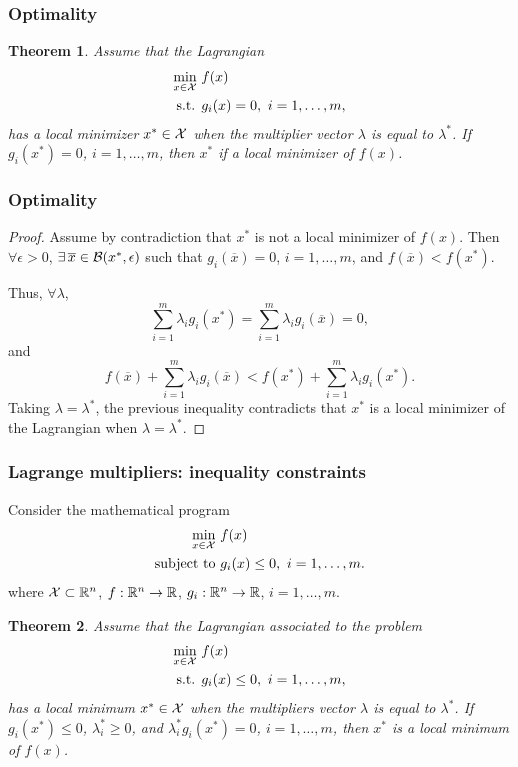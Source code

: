 \documentclass[usepdftitle=false]{beamer}
\newtheorem{thm}{Theorem}
\begin{document}
\begin{frame}
\frametitle{Optimality}

\begin{thm}
Assume that the Lagrangian
\begin{align*}
\min_{x \in {\mathcal{X}}} \ & f(x) \\
\mbox{s.t. } & g_i(x) = 0,\ i = 1,\ldots,m,
\end{align*}
has a local minimizer $x^* \in {\mathcal{X}}$ when the multiplier vector $\lambda$ is equal to $\lambda^*$.
If $g_i(x^*) = 0$, $i = 1,\ldots,m$, then $x^*$ if a local minimizer of $f(x)$.
\end{thm}

\end{frame}

\begin{frame}
\frametitle{Optimality}

\begin{proof}
Assume by contradiction that $x^*$ is not a local minimizer of $f(x)$.
Then $\forall \epsilon > 0$, $\exists\, \overline{x} \in {\mathcal{B}}(x^*, \epsilon)$ such that $g_i(\overline{x}) = 0$, $i = 1,\ldots,m$, and $f(\overline{x}) < f(x^*)$.
	
Thus, $\forall \lambda$,
	$$
	\sum_{i = 1}^{m} \lambda_i g_i(x^*) = \sum_{i = 1}^{m} \lambda_i g_i(\overline{x}) = 0,
	$$
and
$$
f(\overline{x}) + \sum_{i = 1}^{m} \lambda_i g_i(\overline{x}) < f(x^*) + \sum_{i = 1}^{m} \lambda_i g_i(x^*).
$$
Taking $\lambda = \lambda^*$, the previous inequality contradicts that $x^*$ is a local minimizer of the Lagrangian when $\lambda = \lambda^*$.
\end{proof}

\end{frame}

\begin{frame}
\frametitle{Lagrange multipliers: inequality constraints}

Consider the mathematical program
\begin{align*}
\min_{x \in {\mathcal{X}}} \ & f(x) \\
\mbox{subject to } & g_i(x) \leq 0,\ i = 1,\ldots,m.
\end{align*}
where ${\mathcal{X}} \subset {\mathbb{R}}^n$, $f: {\mathbb{R}}^n \rightarrow {\mathbb{R}}$, $g_i: {\mathbb{R}}^n \rightarrow {\mathbb{R}}$, $i = 1,\ldots,m$.

\mbox{}

\begin{thm}
Assume that the Lagrangian associated to the problem
\begin{align*}
\min_{x \in {\mathcal{X}}} \ & f(x) \\
\mbox{s.t. } & g_i(x) \leq 0,\ i = 1,\ldots,m,
\end{align*}
has a local minimum $x^* \in {\mathcal{X}}$ when the multipliers vector $\lambda$ is equal to $\lambda^*$.
If $g_i(x^*) \leq 0$, $\lambda^*_i \geq 0$, and $\lambda^*_i g_i(x^*) = 0$, $i = 1,\ldots,m$, then $x^*$ is a local minimum of $f(x)$.
\end{thm}

\end{frame}
\end{document}
